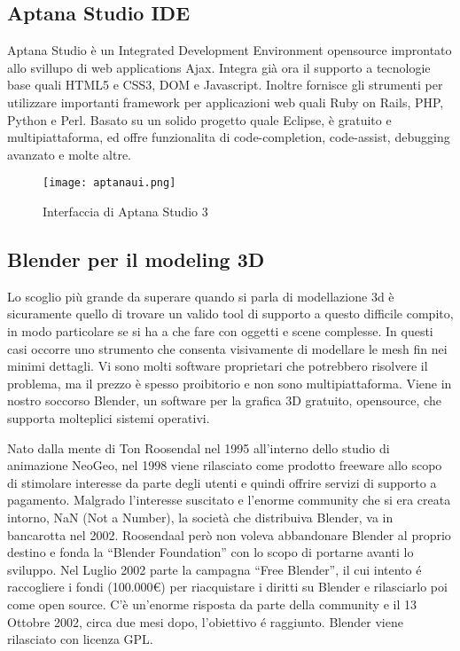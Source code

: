 \subsection{Aptana Studio IDE}
Aptana Studio è un Integrated Development Environment opensource improntato allo svillupo di web applications Ajax. Integra già ora il supporto a tecnologie base quali HTML5 e CSS3, DOM e Javascript. Inoltre fornisce gli strumenti per utilizzare importanti framework per applicazioni web quali Ruby on Rails, PHP, Python e Perl. Basato su un solido progetto quale Eclipse, è gratuito e multipiattaforma, ed offre funzionalita di code-completion, code-assist, debugging avanzato e molte altre. 

\begin{figure}[Ht]
\centering
\texttt{[image: aptanaui.png]}
\caption{Interfaccia di Aptana Studio 3}
\label{label:aptanaui}
\end{figure}

\subsection{Blender per il modeling 3D}
Lo scoglio più grande da superare quando si parla di modellazione 3d è sicuramente quello di trovare un valido tool di supporto a questo difficile compito, in modo particolare se si ha a che fare con oggetti e scene complesse. In questi casi occorre uno strumento che consenta visivamente di modellare le mesh fin nei minimi dettagli. Vi sono molti software proprie\-tari che potrebbero risolvere il problema, ma il prezzo è spesso proibitorio e non sono multipiattaforma. Viene in nostro soccorso Blender, un software per la grafica 3D gratuito, opensource, che supporta molteplici sistemi operativi.

Nato dalla mente di Ton Roosendal nel 1995 all'interno dello studio di animazione NeoGeo, nel 1998 viene rilasciato come prodotto freeware allo scopo di stimolare interesse da parte degli utenti e quindi offrire servizi di supporto a pagamento. Malgrado l'interesse suscitato e l'enorme community che si era creata intorno, NaN (Not a Number), la società che distribuiva Blender, va in bancarotta nel 2002. Roosendaal però non voleva abbandonare Blender al proprio destino e fonda la “Blender Foundation” con lo scopo di  portarne avanti lo sviluppo. Nel Luglio 2002 parte la campagna “Free Blender”, il cui intento é raccogliere i fondi (100.000\euro) per riacquistare i diritti su Blender e rilasciarlo poi come open source. C'è un'enorme risposta da parte della community e il 13 Ottobre 2002, circa due mesi dopo, l'obiettivo é raggiunto. Blender viene rilasciato con licenza GPL.

